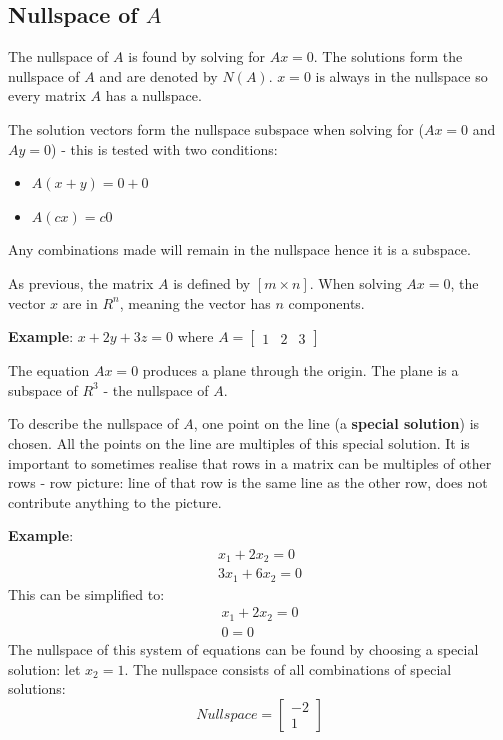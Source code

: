 \documentclass[10pt,a4paper]{article}
\begin{document}
\subsection{Nullspace of $A$}
The nullspace of $A$ is found by solving for $Ax=0$. The solutions form the nullspace of $A$ and are
denoted by $N(A)$. $x=0$ is always in the nullspace so every matrix $A$ has a nullspace.\par 
The solution vectors form the nullspace subspace when solving for ($Ax=0$ and $Ay=0$) - this is tested with two conditions:
\begin{itemize}
	\item $A(x+y)=0+0$
	\item $A(cx)=c0$
\end{itemize}
Any combinations made will remain in the nullspace hence it is a subspace. \par 
As previous, the matrix $A$ is defined by $[m\times n]$. When solving $Ax=0$, the vector $x$ are in
$R^n$, meaning the vector has $n$ components. \par 
\textbf{Example}: $x+2y+3z=0$ where $A = \begin{bmatrix}
	1 & 2 & 3
	\end{bmatrix}$ \par
The equation $Ax=0$ produces a plane through the origin. The plane is a subspace of $R^3$ - the
nullspace of $A$. \par 
To describe the nullspace of $A$, one point on the line (a \textbf{special solution}) is chosen. All
the points on the line are multiples of this special solution. It is important to sometimes realise
that rows in a matrix can be multiples of other rows - row picture: line of that row is the same
line as the other row, does not contribute anything to the picture.\par 
\textbf{Example}:
\begin{align} \nonumber
	x_1 + 2x_2 = 0 \\ 
	3x_1 + 6x_2 = 0 \nonumber
\end{align}
This can be simplified to:
\begin{align} \nonumber
	x_1 + 2x_2 = 0 \\
	0=0\nonumber
\end{align}
The nullspace of this system of equations can be found by choosing a special solution: let $x_2 =
1$. The nullspace consists of all combinations of special solutions:
$$Nullspace = \begin{bmatrix}
	-2 \\ 
	1
\end{bmatrix}$$
\end{document}
